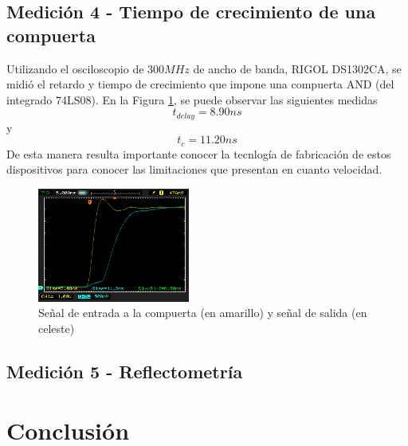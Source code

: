 \documentclass[a4paper,10pt]{article}
\begin{document}
	\subsection{Medición 4 - Tiempo de crecimiento de una compuerta}
	Utilizando el osciloscopio de $300MHz$ de ancho de banda, RIGOL DS1302CA, se midi\'o el retardo y tiempo de crecimiento que impone una compuerta AND (del integrado 74LS08). En la Figura \ref{img009}, se puede observar las siguientes medidas $$t_{delay}=8.90ns$$y  $$t_{c}=11.20ns$$
	De esta manera resulta importante conocer la tecnlog\'ia de fabricaci\'on de estos dispositivos para conocer las limitaciones que presentan en cuanto velocidad.
		\begin{figure}[!htb]
			\centering
			\includegraphics[width=5cm]
			{Imagenes/Risetime3.png}
			\caption{Se\~nal de entrada a la compuerta (en amarillo) y se\~nal de salida (en celeste)}
			\label{img009}
		\end{figure}
				
	\subsection{Medición 5 - Reflectometría}
	\newpage 
	\section{Conclusión}
\end{document}
